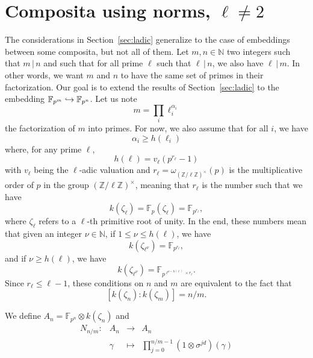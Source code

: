 \documentclass[a4paper,11pt]{article}
\begin{document}
\section{Composita using norms, $\ell\neq2$}
\label{sec:comp-norm}

The considerations in Section~\ref{sec:ladic} generalize to the case of
embeddings between some composita, but not all of them. Let $m, n\in\mathbb{N}$
two integers such that $m\,|\,n$ and such that for all prime $\ell$ such that
$\ell\,|\,n$, we also have $\ell\,|\,m$. In other words, we want $m$ and $n$ to
have the same set of primes in their factorization. Our goal is to extend the
results of Section~\ref{sec:ladic} to the embedding
$\mathbb{F}_{p^m}\hookrightarrow\mathbb{F}_{p^n}$. Let us note 
\[
  m = \prod_i \ell_i^{\alpha_i}
\]
the factorization of $m$ into primes. For now, we also assume that for all $i$,
we have 
\[
  \alpha_i\geq h(\ell_i)
\]
where, for any prime $\ell$, 
\[
  h(\ell) = v_\ell(p^{r_\ell}-1)
\]
with $v_\ell$ being the $\ell$-adic valuation and
$r_\ell=\omega_{(\mathbb{Z}/\ell\mathbb{Z})^\times}(p)$ is the multiplicative
order of $p$ in the group $(\mathbb{Z}/\ell\mathbb{Z})^\times$, meaning that
$r_\ell$ is the number such that we have 
\[
  k(\zeta_\ell)=\mathbb{F}_p(\zeta_\ell)=\mathbb{F}_{p^{r_\ell}},
\]
where $\zeta_\ell$ refers to a $\ell$-th primitive root of unity.
In the end, these numbers mean that given an integer $\nu\in\mathbb{N}$, if
$1\leq\nu\leq h(\ell)$, we have
\[
  k(\zeta_{\ell^\nu}) = \mathbb{F}_{p^{r_\ell}},
\]
and if $\nu\geq h(\ell)$, we have
\[
  k(\zeta_{\ell^\nu}) = \mathbb{F}_{p^{\ell^{\nu-h(\ell)}\times r_\ell}}.
\]
Since $r_\ell\leq\ell-1$, these conditions on $n$ and $m$ are equivalent to the fact that
\[
  [k(\zeta_n):k(\zeta_m)] = n/m.
\]

We define $A_n=\mathbb{F}_{p^n}\otimes k(\zeta_n)$ and
\[
\begin{array}{cccc}
  N_{n/m}: & A_n & \to & A_n \\
  & \gamma & \mapsto & \prod_{j=0}^{n/m-1} (1\otimes \sigma^{jd})(\gamma)
\end{array}
\]
\end{document}
